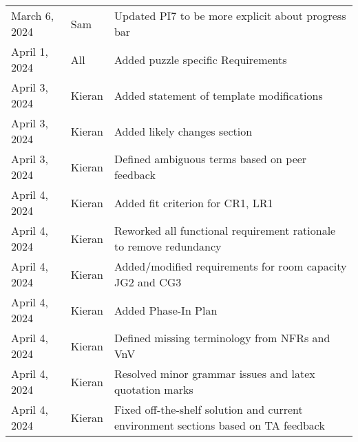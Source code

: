 \documentclass[12pt]{article}
\begin{document}
\begin{table}[hp]
\begin{tabularx}{\textwidth}{llX}
            March 6, 2024 & Sam & Updated PI7 to be more explicit about progress bar\\
            April 1, 2024 & All & Added puzzle specific Requirements\\
            April 3, 2024 & Kieran & Added statement of template modifications\\
            April 3, 2024 & Kieran & Added likely changes section\\
            April 3, 2024 & Kieran & Defined ambiguous terms based on peer feedback\\
            April 4, 2024 & Kieran & Added fit criterion for CR1, LR1\\
            April 4, 2024 & Kieran & Reworked all functional requirement rationale to remove redundancy\\
            April 4, 2024 & Kieran & Added/modified requirements for room capacity JG2 and CG3\\
            April 4, 2024 & Kieran & Added Phase-In Plan\\
            April 4, 2024 & Kieran & Defined missing terminology from NFRs and VnV\\
            April 4, 2024 & Kieran & Resolved minor grammar issues and latex quotation marks\\
            April 4, 2024 & Kieran & Fixed off-the-shelf solution and current environment sections based on TA feedback\\
		\bottomrule
	\end{tabularx}
\end{table}

~\newpage

\end{document}
